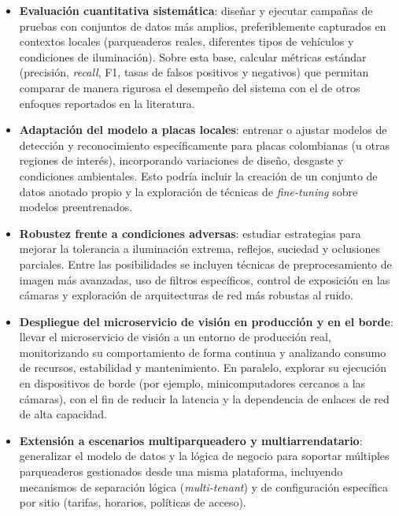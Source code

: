 \begin{itemize}
    \item \textbf{Evaluación cuantitativa sistemática}: diseñar y ejecutar campañas de pruebas con conjuntos de datos más amplios, preferiblemente capturados en contextos locales (parqueaderos reales, diferentes tipos de vehículos y condiciones de iluminación). Sobre esta base, calcular métricas estándar (precisión, \textit{recall}, F1, tasas de falsos positivos y negativos) que permitan comparar de manera rigurosa el desempeño del sistema con el de otros enfoques reportados en la literatura.
    
    \item \textbf{Adaptación del modelo a placas locales}: entrenar o ajustar modelos de detección y reconocimiento específicamente para placas colombianas (u otras regiones de interés), incorporando variaciones de diseño, desgaste y condiciones ambientales. Esto podría incluir la creación de un conjunto de datos anotado propio y la exploración de técnicas de \textit{fine-tuning} sobre modelos preentrenados.
    
    \item \textbf{Robustez frente a condiciones adversas}: estudiar estrategias para mejorar la tolerancia a iluminación extrema, reflejos, suciedad y oclusiones parciales. Entre las posibilidades se incluyen técnicas de preprocesamiento de imagen más avanzadas, uso de filtros específicos, control de exposición en las cámaras y exploración de arquitecturas de red más robustas al ruido.
    
    \item \textbf{Despliegue del microservicio de visión en producción y en el borde}: llevar el microservicio de visión a un entorno de producción real, monitorizando su comportamiento de forma continua y analizando consumo de recursos, estabilidad y mantenimiento. En paralelo, explorar su ejecución en dispositivos de borde (por ejemplo, minicomputadores cercanos a las cámaras), con el fin de reducir la latencia y la dependencia de enlaces de red de alta capacidad.
    
    \item \textbf{Extensión a escenarios multi\-parqueadero y multi\-arrendatario}: generalizar el modelo de datos y la lógica de negocio para soportar múltiples parqueaderos gestionados desde una misma plataforma, incluyendo mecanismos de separación lógica (\textit{multi-tenant}) y de configuración específica por sitio (tarifas, horarios, políticas de acceso).
    

\end{itemize}
